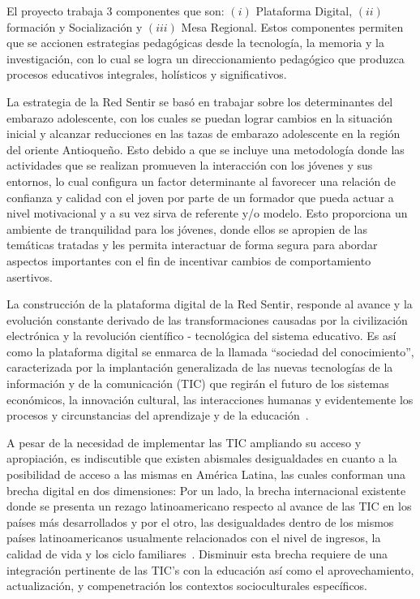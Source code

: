 \documentclass[journal,transmag]{IEEEtran}
\begin{document}
El proyecto trabaja 3 componentes que son: $(i)$ Plataforma Digital, $(ii)$ formación y Socialización y $(iii)$ Mesa Regional. Estos componentes permiten que se accionen estrategias pedagógicas desde la tecnología, la memoria y la investigación, con lo cual se logra un direccionamiento pedagógico que produzca procesos educativos integrales, holísticos y significativos. 

La estrategia de la Red Sentir se basó en trabajar sobre los determinantes del embarazo adolescente, con los cuales se puedan lograr cambios en la situación inicial y alcanzar reducciones en las tazas de embarazo adolescente en la región del oriente Antioqueño. Esto debido a que se incluye una metodología donde las actividades que se realizan promueven la interacción con los jóvenes y sus entornos, lo cual configura un factor determinante al favorecer una relación de confianza y calidad con el joven por parte de un formador que pueda actuar a nivel motivacional y a su vez sirva de referente y/o modelo. Esto proporciona un ambiente de tranquilidad para los jóvenes, donde ellos se apropien de las temáticas tratadas y les permita interactuar de forma segura para abordar aspectos importantes con el fin de incentivar cambios de comportamiento asertivos.

La construcción de la plataforma digital de la Red Sentir, responde al avance y la evolución constante derivado de las transformaciones causadas por la civilización electrónica y la revolución científico - tecnológica del sistema educativo. Es así como la plataforma digital se enmarca de la llamada ``sociedad del conocimiento'', caracterizada por la implantación generalizada de las nuevas tecnologías de la información y de la comunicación (TIC) que regirán el futuro de los sistemas económicos, la innovación cultural, las interacciones humanas y evidentemente los procesos y circunstancias del aprendizaje y de la educación~\cite{Asin2009}.

A pesar de la necesidad de implementar las TIC ampliando su acceso y apropiación, es indiscutible que existen abismales desigualdades en cuanto a la posibilidad de acceso a las mismas en América Latina, las cuales conforman una brecha digital en dos dimensiones: Por un lado, la brecha internacional existente donde se presenta un rezago latinoamericano respecto al avance de las TIC en los países más desarrollados y por el otro, las desigualdades dentro de los mismos países latinoamericanos usualmente relacionados con el nivel de ingresos, la calidad de vida y los ciclo familiares~\cite{Sunkel2006}. Disminuir esta brecha requiere de una integración pertinente de las TIC's con la educación así como el aprovechamiento, actualización, y compenetración los contextos socioculturales específicos.
\end{document}
